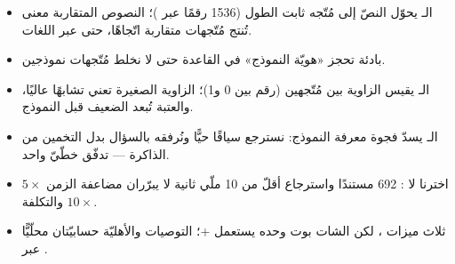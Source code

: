 \begin{summary}
\begin{itemize}
  \item الـ  يحوّل النصّ إلى مُتّجه ثابت الطول (1536 رقمًا عبر
    )؛ النصوص المتقاربة معنى تُنتج مُتّجهات متقاربة
    اتّجاهًا، حتى عبر اللغات.
  \item بادئة  تحجز «هويّة النموذج» في القاعدة حتى لا نخلط مُتّجهات نموذجين.
  \item الـ  يقيس الزاوية بين مُتّجهين (رقم بين 0 و1)؛ الزاوية
    الصغيرة تعني تشابهًا عاليًا، والعتبة  تُبعد الضعيف قبل
    النموذج.
  \item الـ  يسدّ فجوة معرفة النموذج: نسترجع سياقًا حيًّا ونُرفقه بالسؤال بدل
    التخمين من الذاكرة — تدفّق خطّيّ واحد.
  \item اخترنا  لا : 692 مستندًا واسترجاع أقلّ من 10
    ملّي ثانية لا يبرّران مضاعفة الزمن $5\times$ والتكلفة $10\times$.
  \item ثلاث ميزات ، لكن الشات بوت وحده يستعمل +؛ التوصيات
    والأهليّة حسابيّتان محلّيًّا عبر .
\end{itemize}
\end{summary}

